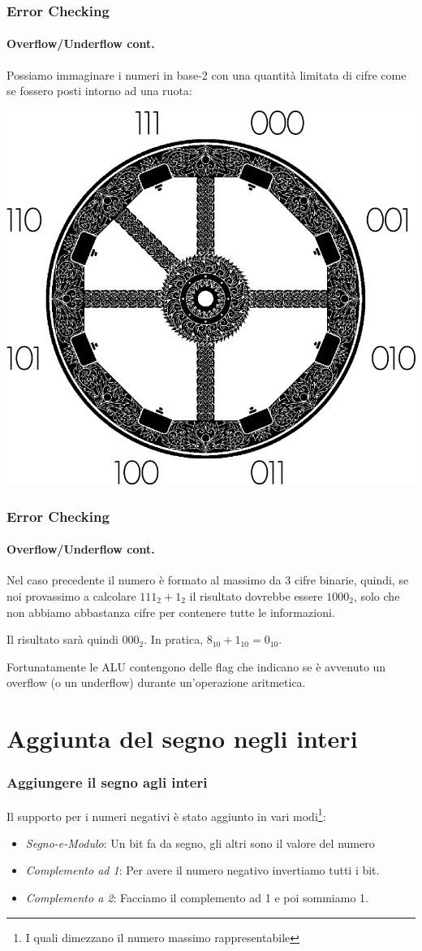 \documentclass{beamer}
\begin{document}
	\begin{frame}
    \frametitle{Error Checking}
    \framesubtitle{Overflow/Underflow cont.}
    Possiamo immaginare i numeri in base-2 con una quantità limitata di cifre come se fossero posti
    intorno ad una ruota:
    
    \begin{center}
    \includegraphics[width=.5\textwidth]{IMGs/TheBurningWheel.png}
    \end{center}

  \end{frame}
  
  	\begin{frame}
    \frametitle{Error Checking}
    \framesubtitle{Overflow/Underflow cont.}
    Nel caso precedente il numero è formato al massimo da 3 cifre binarie, quindi, se noi provassimo a
    calcolare $111_{2} + 1_{2}$ il risultato dovrebbe essere $1000_{2}$, solo che non abbiamo abbastanza
    cifre per contenere tutte le informazioni.
    
    Il risultato sarà quindi $000_{2}$. In pratica, $8_{10} + 1_{10} = 0_{10}$.
    
    \vspace{2em}
    \pause
    
    Fortunatamente le ALU contengono delle flag che indicano se è avvenuto un overflow (o un underflow)
    durante un'operazione aritmetica.
  \end{frame}
  
  \section[NegativeRep]{Aggiunta del segno negli interi}
  \begin{frame}
  		\frametitle{Aggiungere il segno agli interi}
  		Il supporto per i numeri negativi è stato aggiunto in vari modi\footnote{I quali dimezzano il
  		numero massimo rappresentabile}:
    \begin{itemize}
    		\item \emph{Segno-e-Modulo}: Un bit fa da segno, gli altri sono il valore del numero
    		\item \emph{Complemento ad 1}: Per avere il numero negativo invertiamo tutti i bit.
    		\item \emph{Complemento a 2}: Facciamo il complemento ad 1 e poi sommiamo 1.
    \end{itemize}
  \end{frame}
\end{document}
